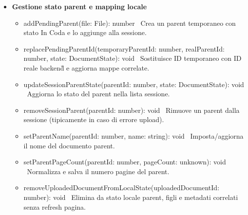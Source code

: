 \documentclass[a4paper,11pt]{article}
\begin{document}
\begin{itemize}[noitemsep, topsep=0pt]
\item \textbf{Gestione stato parent e mapping locale}
\begin{itemize}[noitemsep, topsep=0pt]
\item addPendingParent(file: File): number \
Crea un parent temporaneo con stato In Coda e lo aggiunge alla sessione.
\item replacePendingParentId(temporaryParentId: number, realParentId: number, state: DocumentState): void \
Sostituisce ID temporaneo con ID reale backend\G{} e aggiorna mappe correlate.
\item updateSessionParentState(parentId: number, state: DocumentState): void \
Aggiorna lo stato del parent nella lista sessione.
\item removeSessionParent(parentId: number): void \
Rimuove un parent dalla sessione (tipicamente in caso di errore upload).
\item setParentName(parentId: number, name: string): void \
Imposta/aggiorna il nome del documento parent.
\item setParentPageCount(parentId: number, pageCount: unknown): void \
Normalizza e salva il numero pagine del parent.
\item removeUploadedDocumentFromLocalState(uploadedDocumentId: number): void \
Elimina da stato locale parent, figli e metadati correlati senza refresh pagina.
\end{itemize}


\end{itemize}
\end{document}

